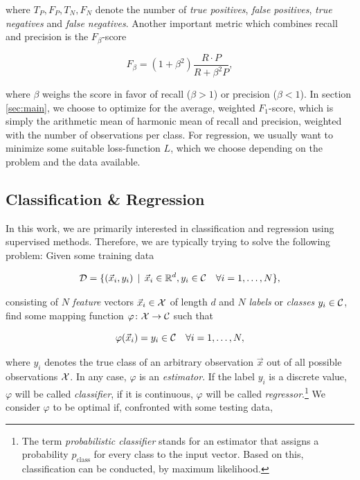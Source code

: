 where $T_P, F_P, T_N, F_N$ denote the number of \emph{true positives}, \emph{false positives}, \emph{true negatives} and \emph{false negatives}. Another important metric which combines recall and precision is the $F_\beta$-score

\begin{equation}
\label{eq:f-beta-score}
F_\beta = (1 + \beta^2) \frac{R \cdot P}{R + \beta^2 P},
\end{equation}

where $\beta$ weighs the score in favor of recall ($\beta > 1$) or precision ($\beta < 1$). In section \ref{sec:main}, we choose to optimize for the average, weighted $F_1$-score, which is simply the arithmetic mean of harmonic mean of recall and precision, weighted with the number of observations per class. For regression, we usually want to minimize some suitable loss-function $L$, which we choose depending on the problem and the data available.

\subsection{Classification \& Regression}

In this work, we are primarily interested in classification and regression using supervised methods. Therefore, we are typically trying to solve the following problem: Given some training data

\begin{equation}
\mathcal{D} = \{ (\vec x_i, y_i) \, \mid \, \vec x_i \in \mathbb{R}^d, y_i \in \mathcal{C} \quad \forall i = 1,\ldots,N \},
\end{equation}

consisting of $N$ \emph{feature} vectors $\vec x_i \in \mathcal{X}$ of length $d$ and $N$ \emph{labels} or \emph{classes} $y_i \in \mathcal{C}$, find some mapping function $\varphi \colon \mathcal{X} \to \mathcal{C}$ such that

\begin{equation}
\varphi(\vec x_i) = y_i \in \mathcal{C} \quad \forall i = 1,\ldots,N,
\end{equation}

where $y_i$ denotes the true class of an arbitrary observation $\vec x$ out of all possible observations $\mathcal{X}$. In any case, $\varphi$ is an \emph{estimator}. If the label $y_i$ is a discrete value, $\varphi$ will be called \emph{classifier}, if it is continuous, $\varphi$ will be called \emph{regressor}.\footnote{The term \emph{probabilistic classifier} stands for an estimator that assigns a probability $p_{\text{class}}$ for every class to the input vector. Based on this, classification can be conducted, \eg by maximum likelihood.} We consider $\varphi$ to be optimal if, confronted with some testing data,

